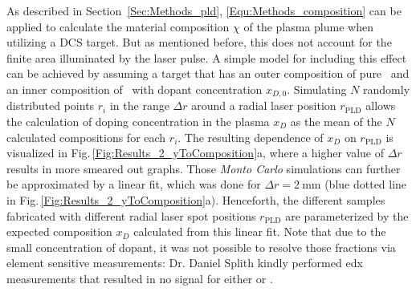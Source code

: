 As described in Section~\ref{Sec:Methods_pld}, \eqref{Equ:Methods_composition} can be applied to calculate the material composition $\chi$ of the plasma plume when utilizing a \gls{DCS} target.
But as mentioned before, this does not account for the finite area illuminated by the laser pulse.
A simple model for including this effect can be achieved by assuming a target that has an outer composition of pure \cro\ and an inner composition of \cro\ with dopant concentration $x_{D,0}$.
Simulating $N$ randomly distributed points $r_i$ in the range $\Delta r$ around a radial laser position $r_\mathrm{PLD}$ allows the calculation of doping concentration in the plasma $x_D$ as the mean of the $N$ calculated compositions for each $r_i$.
The resulting dependence of $x_D$ on $r_\mathrm{PLD}$ is visualized in Fig.\,\ref{Fig:Results_2_yToComposition}a, where a higher value of $\Delta r$ results in more smeared out graphs.
Those \emph{Monto Carlo} simulations can further be approximated by a linear fit, which was done for $\Delta r=\qty{2}{\mm}$ (blue dotted line in Fig.\,\ref{Fig:Results_2_yToComposition}a).
Henceforth, the different samples fabricated with different radial laser spot positions $r_\mathrm{PLD}$ are parameterized by the expected composition $x_D$ calculated from this linear fit.
Note that due to the small concentration of dopant, it was not possible to resolve those fractions via element sensitive measurements: Dr. Daniel Splith kindly performed \gls{edx} measurements that resulted in no signal for either  or .

